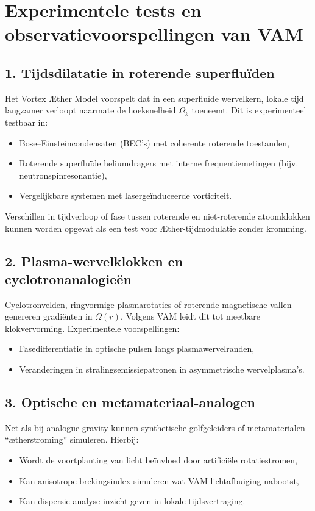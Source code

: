 \section{Experimentele tests en observatievoorspellingen van VAM}


\subsection{1. Tijdsdilatatie in roterende superfluïden}

Het Vortex Æther Model voorspelt dat in een superfluïde wervelkern, lokale tijd langzamer verloopt naarmate de hoeksnelheid $\Omega_k$ toeneemt. Dit is experimenteel testbaar in:
\begin{itemize}
    \item Bose–Einsteincondensaten (BEC's) met coherente roterende toestanden,
    \item Roterende superfluïde heliumdragers met interne frequentiemetingen (bijv. neutronspinresonantie),
    \item Vergelijkbare systemen met lasergeïnduceerde vorticiteit.
\end{itemize}

Verschillen in tijdverloop of fase tussen roterende en niet-roterende atoomklokken kunnen worden opgevat als een test voor Æther-tijdmodulatie zonder kromming.~\cite{Steinhauer2016}


\subsection{2. Plasma-wervelklokken en cyclotronanalogieën}

Cyclotronvelden, ringvormige plasmarotaties of roterende magnetische vallen genereren gradiënten in $\Omega(r)$. Volgens VAM leidt dit tot meetbare klokvervorming. Experimentele voorspellingen:
\begin{itemize}
    \item Fasedifferentiatie in optische pulsen langs plasmawervelranden,~\cite{Unruh1981}
    \item Veranderingen in stralingsemissiepatronen in asymmetrische wervelplasma's.
\end{itemize}

\subsection{3. Optische en metamateriaal-analogen}

Net als bij analogue gravity kunnen synthetische golfgeleiders of metamaterialen “ætherstroming” simuleren. Hierbij:
\begin{itemize}
    \item Wordt de voortplanting van licht beïnvloed door artificiële rotatiestromen,
    \item Kan anisotrope brekingsindex simuleren wat VAM-lichtafbuiging nabootst,
    \item Kan dispersie-analyse inzicht geven in lokale tijdsvertraging.
\end{itemize}

